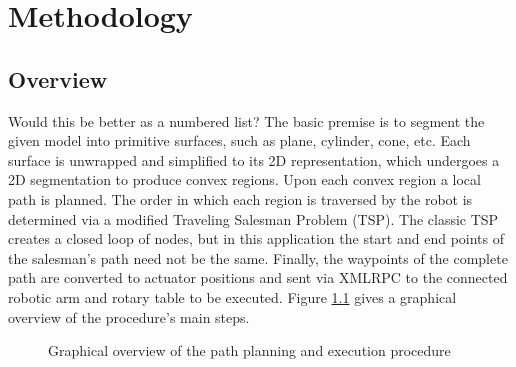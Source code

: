 \chapter{Methodology}\label{methodology}

\section{Overview}
Would this be better as a numbered list?
The basic premise is to segment the given model into primitive surfaces, such as plane, cylinder, cone, etc.
Each surface is unwrapped and simplified to its 2D representation, which undergoes a 2D segmentation to produce convex regions.
Upon each convex region a local path is planned.
The order in which each region is traversed by the robot is determined via a modified Traveling Salesman Problem (TSP).
The classic TSP creates a closed loop of nodes, but in this application the start and end points of the salesman's path need not be the same.
Finally, the waypoints of the complete path are converted to actuator positions and sent via XMLRPC to the connected robotic arm and rotary table to be executed.
Figure \ref{fig:overview} gives a graphical overview of the procedure's main steps.

\begin{figure}[ht]
	\centering
{}
	\caption{Graphical overview of the path planning and execution procedure}
	\label{fig:overview}
\end{figure}

